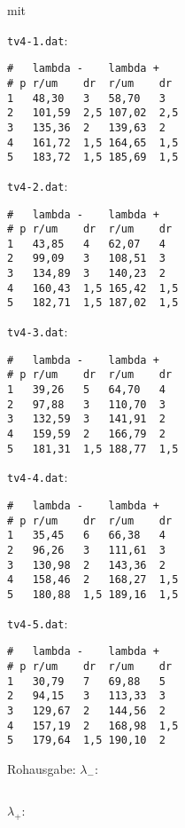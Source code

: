     mit
    \begin{multicols}{2}
        \texttt{tv4-1.dat}:
        \begin{verbatim}
#   lambda -    lambda +
# p r/um    dr  r/um    dr
1   48,30   3   58,70   3
2   101,59  2,5 107,02  2,5
3   135,36  2   139,63  2
4   161,72  1,5 164,65  1,5
5   183,72  1,5 185,69  1,5
        \end{verbatim}
        \texttt{tv4-2.dat}:
        \begin{verbatim}
#   lambda -    lambda +
# p r/um    dr  r/um    dr
1   43,85   4   62,07   4
2   99,09   3   108,51  3
3   134,89  3   140,23  2
4   160,43  1,5 165,42  1,5
5   182,71  1,5 187,02  1,5
        \end{verbatim}
        \texttt{tv4-3.dat}:
        \begin{verbatim}
#   lambda -    lambda +
# p r/um    dr  r/um    dr
1   39,26   5   64,70   4
2   97,88   3   110,70  3
3   132,59  3   141,91  2
4   159,59  2   166,79  2
5   181,31  1,5 188,77  1,5
        \end{verbatim}
        \texttt{tv4-4.dat}:
        \begin{verbatim}
#   lambda -    lambda +
# p r/um    dr  r/um    dr
1   35,45   6   66,38   4
2   96,26   3   111,61  3
3   130,98  2   143,36  2
4   158,46  2   168,27  1,5
5   180,88  1,5 189,16  1,5
        \end{verbatim}
    \end{multicols}
    \texttt{tv4-5.dat}:
        \begin{verbatim}
#   lambda -    lambda +
# p r/um    dr  r/um    dr
1   30,79   7   69,88   5
2   94,15   3   113,33  3
3   129,67  2   144,56  2
4   157,19  2   168,98  1,5
5   179,64  1,5 190,10  2
        \end{verbatim}
    Rohausgabe:
    $\lambda_-$:
    \inputminted[linenos,breaklines,autogobble,frame=leftline,framesep=10pt]{text}{./plots/lambda_minus.output}
    $\lambda_+$:
    \inputminted[linenos,breaklines,autogobble,frame=leftline,framesep=10pt]{text}{./plots/lambda_plus.output}